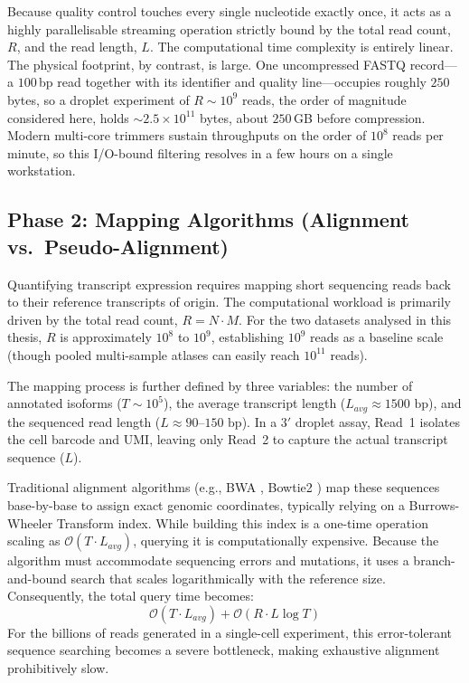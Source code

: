 Because quality control touches every single nucleotide exactly once, it acts as a highly parallelisable streaming operation strictly bound by the total read count, $R$, and the read length, $L$. The computational time complexity is entirely linear. The physical footprint, by contrast, is large. One uncompressed FASTQ record---a $100$\,bp read together with its identifier and quality line---occupies roughly $250$ bytes, so a droplet experiment of $R \sim 10^{9}$ reads, the order of magnitude considered here, holds $\sim 2.5 \times 10^{11}$ bytes, about $250$\,GB before compression. Modern multi-core trimmers sustain throughputs on the order of $10^{8}$ reads per minute, so this I/O-bound filtering resolves in a few hours on a single workstation.

\subsection{Phase 2: Mapping Algorithms (Alignment vs.\ Pseudo-Alignment)}\label{sec:pseudo-align}

Quantifying transcript expression requires mapping short sequencing reads back to their reference transcripts of origin. The computational workload is primarily driven by the total read count, $R = N \cdot M$. For the two datasets analysed in this thesis, $R$ is approximately $10^{8}$ to $10^{9}$, establishing $10^{9}$ reads as a baseline scale (though pooled multi-sample atlases can easily reach $10^{11}$ reads).

The mapping process is further defined by three variables: the number of annotated isoforms ($T \sim 10^5$), the average transcript length ($L_{avg} \approx 1500\text{ bp}$), and the sequenced read length ($L \approx 90\text{--}150\text{ bp}$). In a $3'$ droplet assay, Read~1 isolates the cell barcode and UMI, leaving only Read~2 to capture the actual transcript sequence ($L$).

Traditional alignment algorithms (e.g., BWA \cite{li2009bwa}, Bowtie2 \cite{langmead2012bowtie2}) map these sequences base-by-base to assign exact genomic coordinates, typically relying on a Burrows-Wheeler Transform index. While building this index is a one-time operation scaling as $\mathcal{O}(T \cdot L_{avg})$, querying it is computationally expensive. Because the algorithm must accommodate sequencing errors and mutations, it uses a branch-and-bound search that scales logarithmically with the reference size. Consequently, the total query time becomes:
$$ \mathcal{O}(T \cdot L_{avg}) + \mathcal{O}(R \cdot L \log T) $$
For the billions of reads generated in a single-cell experiment, this error-tolerant sequence searching becomes a severe bottleneck, making exhaustive alignment prohibitively slow.

